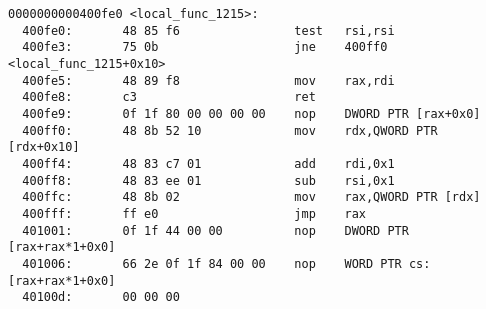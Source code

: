 \begin{lstlisting}[basicstyle=\ttfamily\footnotesize,
basewidth={.5em,.3em}, frame=single]
0000000000400fe0 <local_func_1215>:
  400fe0:       48 85 f6                test   rsi,rsi
  400fe3:       75 0b                   jne    400ff0 <local_func_1215+0x10>
  400fe5:       48 89 f8                mov    rax,rdi
  400fe8:       c3                      ret    
  400fe9:       0f 1f 80 00 00 00 00    nop    DWORD PTR [rax+0x0]
  400ff0:       48 8b 52 10             mov    rdx,QWORD PTR [rdx+0x10]
  400ff4:       48 83 c7 01             add    rdi,0x1
  400ff8:       48 83 ee 01             sub    rsi,0x1
  400ffc:       48 8b 02                mov    rax,QWORD PTR [rdx]
  400fff:       ff e0                   jmp    rax
  401001:       0f 1f 44 00 00          nop    DWORD PTR [rax+rax*1+0x0]
  401006:       66 2e 0f 1f 84 00 00    nop    WORD PTR cs:[rax+rax*1+0x0]
  40100d:       00 00 00 

\end{lstlisting}
